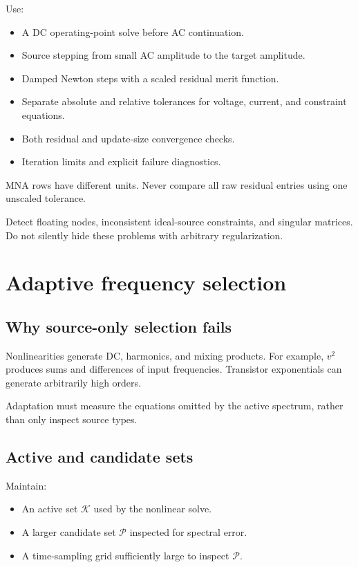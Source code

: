\documentclass[11pt,a4paper]{article}
\begin{document}
Use:
\begin{itemize}
 \item A DC operating-point solve before AC continuation.
 \item Source stepping from small AC amplitude to the target amplitude.
 \item Damped Newton steps with a scaled residual merit function.
 \item Separate absolute and relative tolerances for voltage, current,
       and constraint equations.
 \item Both residual and update-size convergence checks.
 \item Iteration limits and explicit failure diagnostics.
\end{itemize}

MNA rows have different units. Never compare all raw residual entries
using one unscaled tolerance.

Detect floating nodes, inconsistent ideal-source constraints, and
singular matrices. Do not silently hide these problems with arbitrary
regularization.

\section{Adaptive frequency selection}

\subsection{Why source-only selection fails}

Nonlinearities generate DC, harmonics, and mixing products. For example,
$v^2$ produces sums and differences of input frequencies.
Transistor exponentials can generate arbitrarily high orders.

Adaptation must measure the equations omitted by the active spectrum,
rather than only inspect source types.

\subsection{Active and candidate sets}

Maintain:
\begin{itemize}
 \item An active set $\mathcal K$ used by the nonlinear solve.
 \item A larger candidate set $\mathcal P$ inspected for spectral error.
 \item A time-sampling grid sufficiently large to inspect $\mathcal P$.
\end{itemize}
\end{document}
